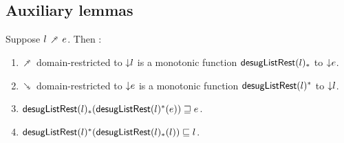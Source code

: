 \subsection{Auxiliary lemmas}

\begin{lemma}
  Suppose $l \dfwdarrow e$. Then :
  \begin{enumerate}
     \item $\dfwdarrow$ domain-restricted to ${\downarrow}{l}$ is a monotonic function $\mathsf{desugListRest}(l)_*$ to ${\downarrow}{e}$.
     \item $\dbwdarrow$ domain-restricted to ${\downarrow}{e}$ is a monotonic function $\mathsf{desugListRest}(l)^*$ to ${\downarrow}{l}$.
     \item $\mathsf{desugListRest}(l)_*(\mathsf{desugListRest}(l)^*(e)) \sqsupseteq e$.
     \item $\mathsf{desugListRest}(l)^*(\mathsf{desugListRest}(l)_*(l)) \sqsubseteq l$.
  \end{enumerate}
\end{lemma}
